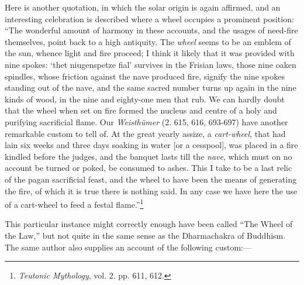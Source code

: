 \documentclass[a4paper, 11pt, oneside, polutonikogreek, english]{article}
\begin{document}
Here is another quotation, in which the solar origin is again affirmed, and an interesting celebration is described where a wheel occupies a prominent position: ``The wonderful amount of harmony in these accounts, and the usages of need-fire themselves, point back to a high antiquity. The \emph{wheel} seems to be an emblem of the sun, whence light and fire proceed; I think it likely that it was provided with nine spokes: `thet niugenspetze fial' survives in the Frisian laws, those nine oaken spindles, whose friction against the nave produced fire, signify the nine spokes standing out of the nave, and the same sacred number turns up again in the nine kinds of wood, in the nine and eighty-one men that rub. We can hardly doubt that the wheel when set on fire formed the nucleus and centre of a holy and purifying sacrificial flame. Our \emph{Weisthümer} (2. 615, 616, 693-697) have another remarkable custom to tell of. At the great yearly assize, a \emph{cart-wheel}, that had lain six weeks and three days soaking in water [or a cesspool], was placed in a fire kindled before the judges, and the banquet lasts till the \emph{nave}, which must on no account be turned or poked, be consumed to ashes. This I take to be a last relic of the pagan sacrificial feast, and the wheel to have been the means of generating the fire, of which it is true there is nothing said. In any case we have here the use of a cart-wheel to feed a festal flame.''\footnote{\emph{Teutonic Mythology}, vol. 2. pp. 611, 612.}

This particular instance might correctly enough have been called ``The Wheel of the Law,'' but not quite in the same sense as the Dharmachakra of Buddhism. The same author also supplies an account of the following custom:---
\end{document}

